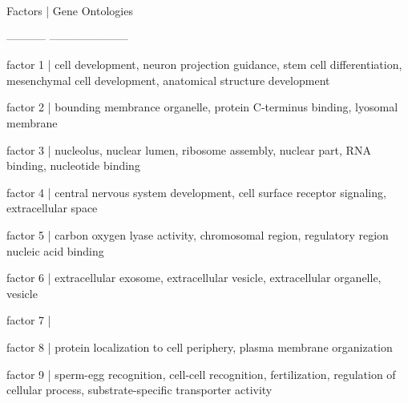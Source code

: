 \documentclass[12pt]{article}\usepackage[]{graphicx}\usepackage[usenames,dvipsnames]{color}
\begin{document}
Factors      |    Gene Ontologies

-----------    ---------------------

 factor 1    |    cell development, neuron projection guidance, stem cell differentiation, mesenchymal cell development, anatomical structure development

 factor 2    |   bounding membrance organelle, protein C-terminus binding, lyosomal membrane

 factor 3    |   nucleolus, nuclear lumen, ribosome assembly, nuclear part, RNA binding, nucleotide binding

 factor 4    |   central nervous system development, cell surface receptor signaling, extracellular space

 factor 5    |   carbon oxygen lyase activity, chromosomal region, regulatory region nucleic acid binding

 factor 6    |   extracellular exosome, extracellular vesicle, extracellular organelle, vesicle

 factor 7    |

 factor 8    |  protein localization to cell periphery, plasma membrane organization

 factor 9    |  sperm-egg recognition, cell-cell recognition, fertilization, regulation of cellular process, substrate-specific transporter activity
\end{document}
